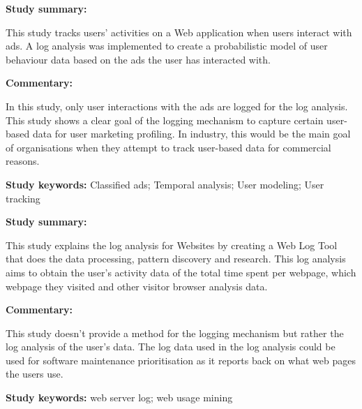 \begin{tcolorbox}[colback=gray!5!white, colframe=deepblue!80!black, title=Tracking User Activities and Marketplace Dynamics in Classified Ads\cite{Waqar2017}]
	\begin{minipage}[t]{0.25\textwidth}
		\textbf{Study summary:}
	\end{minipage}
	\hfill
	\begin{minipage}[t]{0.65\textwidth}
		This study tracks users' activities on a Web application when users interact with ads. A log analysis was implemented to create a probabilistic model of user behaviour data based on the ads the user has interacted with.
	\end{minipage}

	\vspace{0.75em} 

	\begin{minipage}[t]{0.25\textwidth}
		\textbf{Commentary:}
	\end{minipage}
	\hfill
	\begin{minipage}[t]{0.65\textwidth}
		In this study, only user interactions with the ads are logged for the log analysis. This study shows a clear goal of the logging mechanism to capture certain user-based data for user marketing profiling. In industry, this would be the main goal of organisations when they attempt to track user-based data for commercial reasons.
	\end{minipage}
	\tcblower
	\textbf{Study keywords:} Classified ads; Temporal analysis; User modeling; User tracking
\end{tcolorbox}

\begin{tcolorbox}[colback=gray!5!white, colframe=deepblue!80!black, title=Analysis of visitor's behavior from Web Log using Web Log Expert Tool\cite{Kumar2017}]
	\begin{minipage}[t]{0.25\textwidth}
		\textbf{Study summary:}
	\end{minipage}
	\hfill
	\begin{minipage}[t]{0.65\textwidth}
		This study explains the log analysis for Websites by creating a Web Log Tool that does the data processing, pattern discovery and research. This log analysis aims to obtain the user's activity data of the total time spent per webpage, which webpage they visited and other visitor browser analysis data.
	\end{minipage}

	\vspace{0.75em} 

	\begin{minipage}[t]{0.25\textwidth}
		\textbf{Commentary:}
	\end{minipage}
	\hfill
	\begin{minipage}[t]{0.65\textwidth}
		This study doesn't provide a method for the logging mechanism but rather the log analysis of the user's data. The log data used in the log analysis could be used for software maintenance prioritisation as it reports back on what web pages the users use. 
	\end{minipage}
	\tcblower
	\textbf{Study keywords:} web server log; web usage mining
\end{tcolorbox}